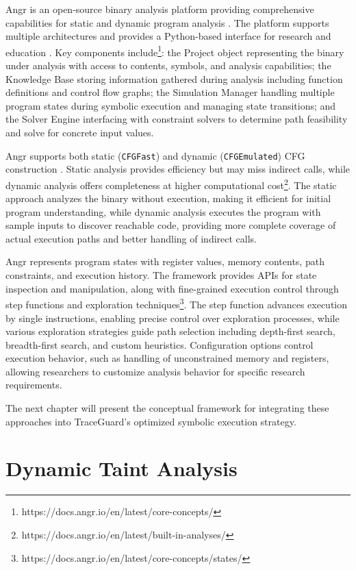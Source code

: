 Angr is an open-source binary analysis platform providing comprehensive capabilities for static and dynamic program analysis \cite{shoshitaishvili_sok_2016}. The platform supports multiple architectures and provides a Python-based interface for research and education \cite{springer_teaching_2018}. Key components include\footnote{https://docs.angr.io/en/latest/core-concepts/}: the Project object representing the binary under analysis with access to contents, symbols, and analysis capabilities; the Knowledge Base storing information gathered during analysis including function definitions and control flow graphs; the Simulation Manager handling multiple program states during symbolic execution and managing state transitions; and the Solver Engine interfacing with constraint solvers to determine path feasibility and solve for concrete input values.

Angr supports both static (\texttt{CFGFast}) and dynamic (\texttt{CFGEmulated}) CFG construction \cite{angr_cfg_analysis}. Static analysis provides efficiency but may miss indirect calls, while dynamic analysis offers completeness at higher computational cost\footnote{https://docs.angr.io/en/latest/built-in-analyses/}. The static approach analyzes the binary without execution, making it efficient for initial program understanding, while dynamic analysis executes the program with sample inputs to discover reachable code, providing more complete coverage of actual execution paths and better handling of indirect calls.

Angr represents program states with register values, memory contents, path constraints, and execution history. The framework provides APIs for state inspection and manipulation, along with fine-grained execution control through step functions and exploration techniques\footnote{https://docs.angr.io/en/latest/core-concepts/states/}. The step function advances execution by single instructions, enabling precise control over exploration processes, while various exploration strategies guide path selection including depth-first search, breadth-first search, and custom heuristics. Configuration options control execution behavior, such as handling of unconstrained memory and registers, allowing researchers to customize analysis behavior for specific research requirements.

The next chapter will present the conceptual framework for integrating these approaches into TraceGuard's optimized symbolic execution strategy.

\section{Dynamic Taint Analysis}

